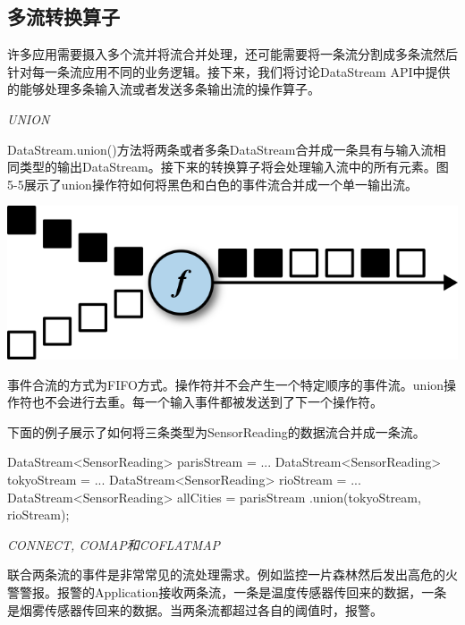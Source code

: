 \documentclass[cn,11pt,chinese]{elegantbook}
\newenvironment{Shaded}{}{}
\newcommand{\FunctionTok}[1]{\textcolor[rgb]{0.02,0.16,0.49}{#1}}
\newcommand{\NormalTok}[1]{#1}
\begin{document}
\hypertarget{ux591aux6d41ux8f6cux6362ux7b97ux5b50}{%
\subsection{多流转换算子}\label{ux591aux6d41ux8f6cux6362ux7b97ux5b50}}

许多应用需要摄入多个流并将流合并处理，还可能需要将一条流分割成多条流然后针对每一条流应用不同的业务逻辑。接下来，我们将讨论DataStream
API中提供的能够处理多条输入流或者发送多条输出流的操作算子。

\emph{UNION}

DataStream.union()方法将两条或者多条DataStream合并成一条具有与输入流相同类型的输出DataStream。接下来的转换算子将会处理输入流中的所有元素。图5-5展示了union操作符如何将黑色和白色的事件流合并成一个单一输出流。

\includegraphics{images/spaf_0505.png}

事件合流的方式为FIFO方式。操作符并不会产生一个特定顺序的事件流。union操作符也不会进行去重。每一个输入事件都被发送到了下一个操作符。

下面的例子展示了如何将三条类型为SensorReading的数据流合并成一条流。

\begin{Shaded}
\begin{Highlighting}[]
\NormalTok{DataStream\textless{}SensorReading\textgreater{} parisStream = ...}
\NormalTok{DataStream\textless{}SensorReading\textgreater{} tokyoStream = ...}
\NormalTok{DataStream\textless{}SensorReading\textgreater{} rioStream = ...}
\NormalTok{DataStream\textless{}SensorReading\textgreater{} allCities = parisStream}
\NormalTok{  .}\FunctionTok{union}\NormalTok{(tokyoStream, rioStream);}
\end{Highlighting}
\end{Shaded}

\emph{CONNECT, COMAP和COFLATMAP}

联合两条流的事件是非常常见的流处理需求。例如监控一片森林然后发出高危的火警警报。报警的Application接收两条流，一条是温度传感器传回来的数据，一条是烟雾传感器传回来的数据。当两条流都超过各自的阈值时，报警。
\end{document}
